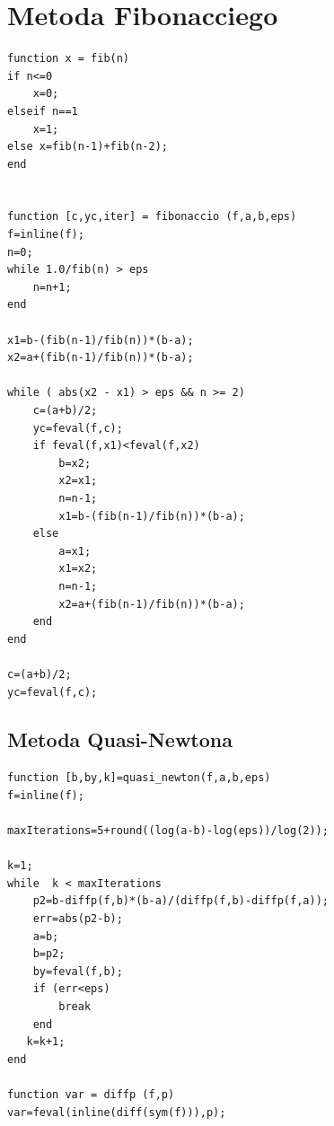 \documentclass{classrep}
\begin{document}
\section{Metoda Fibonacciego}
\begin{lstlisting}
function x = fib(n)
if n<=0
    x=0;
elseif n==1
    x=1;
else x=fib(n-1)+fib(n-2);
end


function [c,yc,iter] = fibonaccio (f,a,b,eps)
f=inline(f);
n=0;
while 1.0/fib(n) > eps
    n=n+1;
end

x1=b-(fib(n-1)/fib(n))*(b-a);
x2=a+(fib(n-1)/fib(n))*(b-a);

while ( abs(x2 - x1) > eps && n >= 2)
    c=(a+b)/2;
    yc=feval(f,c);
    if feval(f,x1)<feval(f,x2)
        b=x2;
        x2=x1;
        n=n-1;
        x1=b-(fib(n-1)/fib(n))*(b-a);
    else
        a=x1;
        x1=x2;
        n=n-1;
        x2=a+(fib(n-1)/fib(n))*(b-a);
    end
end

c=(a+b)/2;
yc=feval(f,c);
\end{lstlisting}


\subsection{Metoda Quasi-Newtona}
\begin{lstlisting}
function [b,by,k]=quasi_newton(f,a,b,eps)
f=inline(f);

maxIterations=5+round((log(a-b)-log(eps))/log(2));

k=1;
while  k < maxIterations    
    p2=b-diffp(f,b)*(b-a)/(diffp(f,b)-diffp(f,a));    
    err=abs(p2-b);
    a=b;
    b=p2;
    by=feval(f,b);
    if (err<eps)
        break
    end
   k=k+1; 
end

function var = diffp (f,p)
var=feval(inline(diff(sym(f))),p);
\end{lstlisting}
\end{document}
